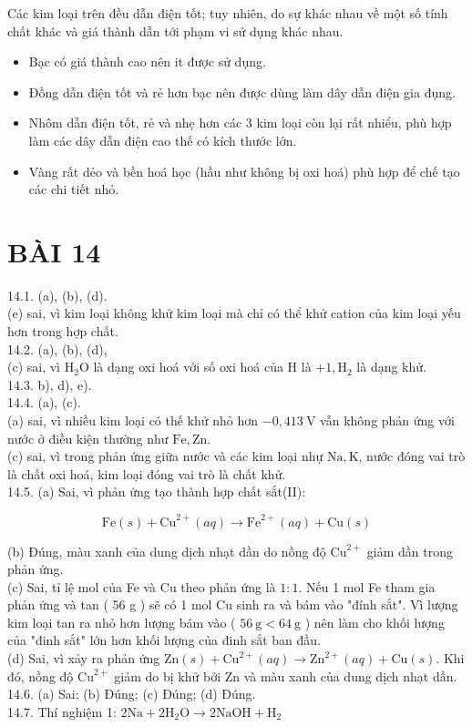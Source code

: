 \documentclass[10pt]{article}
\begin{document}
Các kim loại trên đều dẫn điện tốt; tuy nhiên, do sự khác nhau về một số tính chất khác và giá thành dẫn tới phạm vi sử dụng khác nhau.

\begin{itemize}
  \item Bạc có giá thành cao nên it được sử dụng.
  \item Đồng dẫn điện tốt và rẻ hơn bạc nên được dùng làm dây dẫn điện gia đụng.
  \item Nhôm dẫn điện tốt, rẻ và nhẹ hơn các 3 kim loại còn lại rất nhiểu, phù hợp làm các dây dẫn điện cao thế có kích thước lớn.
  \item Vàng rất dẻo và bền hoá học (hầu như không bị oxi hoá) phù hợp để chế tạo các chi tiết nhỏ.
\end{itemize}

\section*{BÀI 14}
14.1. (a), (b), (d).\\
(e) sai, vì kim loại không khử kim loại mà chỉ có thể khử cation của kim loại yếu hơn trong hợp chất.\\
14.2. (a), (b), (d),\\
(c) sai, vì $\mathrm{H}_{2} \mathrm{O}$ là dạng oxi hoá với số oxi hoá của H là $+1, \mathrm{H}_{2}$ là dạng khử.\\
14.3. b), d), e).\\
14.4. (a), (c).\\
(a) sai, vì nhiều kim loại có thế khử nhỏ hơn $-0,413 \mathrm{~V}$ vẫn không phản ứng với nước ở điều kiện thường như $\mathrm{Fe}, \mathrm{Zn}$.\\
(c) sai, vì trong phản ứng giữa nước và các kim loại nhự $\mathrm{Na}, \mathrm{K}$, nước đóng vai trò là chất oxi hoá, kim loại đóng vai trò là chất khử.\\
14.5. (a) Sai, vì phản ứng tạo thành hợp chất sắt(II):

$$
\mathrm{Fe}(s)+\mathrm{Cu}^{2+}(a q) \rightarrow \mathrm{Fe}^{2+}(a q)+\mathrm{Cu}(s)
$$

(b) Đúng, màu xanh của dung dịch nhạt dần do nồng độ $\mathrm{Cu}^{2+}$ giảm dần trong phản ứng.\\
(c) Sai, tỉ lệ mol của Fe và Cu theo phản ứng là $1: 1$. Nếu 1 mol Fe tham gia phản ứng và tan ( 56 g ) sẽ có 1 mol Cu sinh ra và bám vào "đính sắt". Vì lượng kim loại tan ra nhỏ hơn lượng bám vào ( $56 \mathrm{~g}<64 \mathrm{~g}$ ) nên làm cho khối lượng của "đinh sắt" lớn hơn khối lượng của đinh sắt ban đầu.\\
(d) Sai, vì xảy ra phản ứng $\mathrm{Zn}(s)+\mathrm{Cu}^{2+}(a q) \rightarrow \mathrm{Zn}^{2+}(a q)+\mathrm{Cu}(s)$. Khi đó, nồng độ $\mathrm{Cu}^{2+}$ giảm do bị khử bởi Zn và màu xanh của dung dịch nhạt dần.\\
14.6. (a) Sai; (b) Đúng; (c) Đúng; (d) Đúng.\\
14.7. Thí nghiệm 1: $2 \mathrm{Na}+2 \mathrm{H}_{2} \mathrm{O} \rightarrow 2 \mathrm{NaOH}+\mathrm{H}_{2}$
\end{document}
